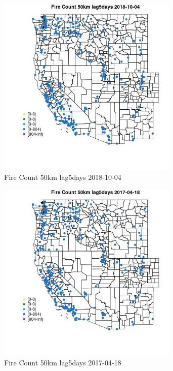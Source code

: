 \begin{figure} 
\centering  
\includegraphics[width=0.77\textwidth]{Code_Outputs/Report_ML_input_PM25_Step4_part_f_de_duplicated_aveswNAs_MapObsFire_Count_50km_lag5days2018-10-04.jpg} 
\caption{\label{fig:Report_ML_input_PM25_Step4_part_f_de_duplicated_aveswNAsMapObsFire_Count_50km_lag5days2018-10-04}Fire Count 50km lag5days 2018-10-04} 
\end{figure} 
 

\begin{figure} 
\centering  
\includegraphics[width=0.77\textwidth]{Code_Outputs/Report_ML_input_PM25_Step4_part_f_de_duplicated_aveswNAs_MapObsFire_Count_50km_lag5days2017-04-18.jpg} 
\caption{\label{fig:Report_ML_input_PM25_Step4_part_f_de_duplicated_aveswNAsMapObsFire_Count_50km_lag5days2017-04-18}Fire Count 50km lag5days 2017-04-18} 
\end{figure} 
 

